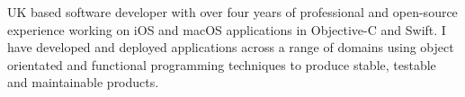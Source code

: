 %
UK based software developer with over four years of professional and open-source
experience working on iOS and macOS applications in Objective-C and Swift. I
have developed and deployed applications across a range of domains using object
orientated and functional programming techniques to produce stable, testable and
maintainable products.

\bigskip

